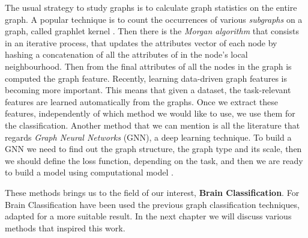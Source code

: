 The usual strategy to study graphs is to calculate graph statistics on the entire graph. A popular technique is to count the occurrences of various \textit{subgraphs} on a graph, called graphlet kernel \cite{pmlr-v5-shervashidze09a}. Then there is the \textit{Morgan algorithm} \cite{Rogers2010ECFP} that consists in an iterative process, that updates the attributes vector of each node by hashing a concatenation of all the attributes of in the node's local neighbourhood. Then from the final attributes of all the nodes in the graph is computed the graph feature. Recently, learning data-driven graph features \cite{NIPS2015_f9be311e} is becoming more important. This means that given a dataset, the task-relevant features are learned automatically from the graphs. Once we extract these features, independently of which method we would like to use, we use them for the classification.
Another method that we can mention is all the literature that regards \textit{Graph Neural Networks} (GNN), a deep learning technique. To build a GNN we need to find out the graph structure, the graph type and its scale, then we should define the loss function, depending on the task, and then we are ready to build a model using computational model \cite{ZHOU202057}. 

These methods brings us to the field of our interest, \textbf{Brain Classification}. For Brain Classification have been used the previous graph classification techniques, adapted for a more suitable result. In the next chapter we will discuss various methods that inspired this work.
